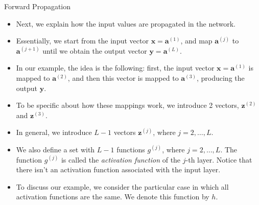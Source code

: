 \documentclass[8pt,american]{beamer}
\begin{document}
\begin{frame}{Forward Propagation}

\begin{block}{}
\begin{itemize}
\justifying
\item Next, we explain how the input values are propagated in the network.
\item Essentially, we start from the input vector
  $\mathbf{x}=\mathbf{a}^{\left(1\right)}$, and map
  $\mathbf{a}^{\left(j\right)}$ to $\mathbf{a}^{\left(j+1\right)}$ until we
  obtain the output vector $\mathbf{y}=\mathbf{a}^{\left(L\right)}$.
\item In our example, the idea is the following: first, the input vector
  $\mathbf{x}=\mathbf{a}^{\left(1\right)}$ is mapped to
  $\mathbf{a}^{\left(2\right)}$, and then this vector is mapped to
  $\mathbf{a}^{\left(3\right)}$, producing the output $\mathbf{y}$.
\item To be specific about how these mappings work, we introduce 2 vectors,
  $\mathbf{z}^{\left(2\right)}$ and $\mathbf{z}^{\left(3\right)}$.
\item In general, we introduce $L-1$ vectors $\mathbf{z}^{\left(j\right)}$,
  where $j=2,\ldots,L$.
\item We also define a set with $L-1$ functions $g^{\left(j\right)}$, where
  $j=2,\ldots,L$. The function $g^{\left(j\right)}$ is called the
  \textit{activation function} of the $j$-th layer. Notice that there isn't an
  activation function associated with the input layer.
\item To discuss our example, we consider the particular case in which all
  activation functions are the same. We denote this function by $h$.
\end{itemize}
\end{block}

\end{frame}
\end{document}
